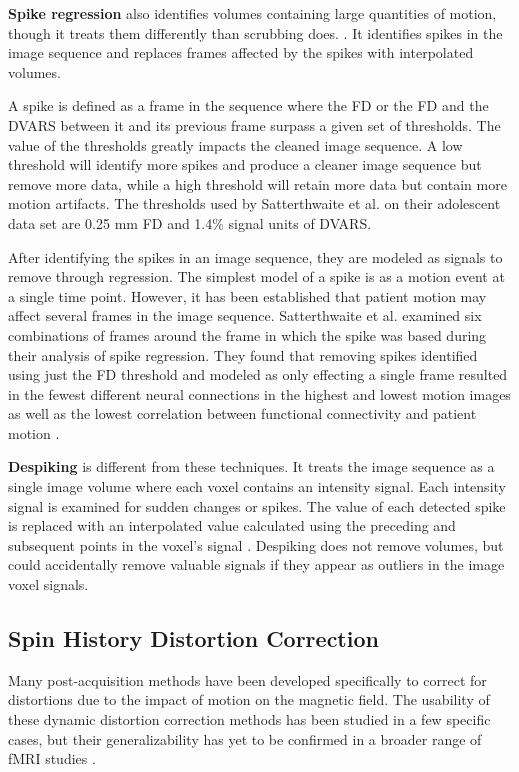 \textbf{Spike regression} also identifies volumes containing large quantities of motion, though it treats them differently than scrubbing does. \cite{Satterthwaite2013}. It identifies spikes in the image sequence and replaces frames affected by the spikes with interpolated volumes.

A spike is defined as a frame in the sequence where the FD or the FD and the DVARS between it and its previous frame surpass a given set of thresholds. The value of the thresholds greatly impacts the cleaned image sequence. A low threshold will identify more spikes and produce a cleaner image sequence but remove more data, while a high threshold will retain more data but contain more motion artifacts. The thresholds used by Satterthwaite et al. on their adolescent data set are 0.25 mm FD and 1.4\% signal units of DVARS. 

After identifying the spikes in an image sequence, they are modeled as signals to remove through regression. The simplest model of a spike is as a motion event at a single time point. However, it has been established that patient motion may affect several frames in the image sequence. Satterthwaite et al. examined six combinations of frames around the frame in which the spike was based during their analysis of spike regression. They found that removing spikes identified using just the FD threshold and modeled as only effecting a single frame resulted in the fewest different neural connections in the highest and lowest motion images as well as the lowest correlation between functional connectivity and patient motion \cite{Satterthwaite2013}.

\textbf{Despiking} is different from these techniques. It treats the image sequence as a single image volume where each voxel contains an intensity signal. Each intensity signal is examined for sudden changes or spikes. The value of each detected spike is replaced with an interpolated value calculated using the preceding and subsequent points in the voxel's signal \cite{Jo2013} \cite{Patel2014}. Despiking does not remove volumes, but could accidentally remove valuable signals if they appear as outliers in the image voxel signals.

\subsection{Spin History Distortion Correction}

Many post-acquisition methods have been developed specifically to correct for distortions due to the impact of motion on the magnetic field. The usability of these dynamic distortion correction methods has been studied in a few specific cases, but their generalizability has yet to be confirmed in a broader range of fMRI studies \cite{Zaitsev2017}.

